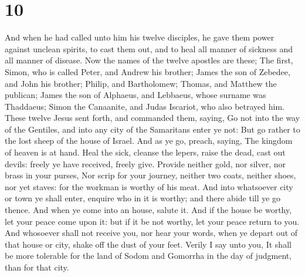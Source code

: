 \hypertarget{section-9}{%
\section{10}\label{section-9}}

 And when he had called unto him his twelve disciples, he
gave them power against unclean spirits, to cast them out, and to heal
all manner of sickness and all manner of disease.  Now the
names of the twelve apostles are these; The first, Simon, who is called
Peter, and Andrew his brother; James the son of Zebedee, and John his
brother;  Philip, and Bartholomew; Thomas, and Matthew the
publican; James the son of Alphaeus, and Lebbaeus, whose surname was
Thaddaeus;  Simon the Canaanite, and Judas Iscariot, who
also betrayed him.  These twelve Jesus sent forth, and
commanded them, saying, Go not into the way of the Gentiles, and into
any city of the Samaritans enter ye not:  But go rather to
the lost sheep of the house of Israel.  And as ye go,
preach, saying, The kingdom of heaven is at hand.  Heal
the sick, cleanse the lepers, raise the dead, cast out devils: freely ye
have received, freely give.  Provide neither gold, nor
silver, nor brass in your purses,  Nor scrip for your
journey, neither two coats, neither shoes, nor yet staves: for the
workman is worthy of his meat.  And into whatsoever city
or town ye shall enter, enquire who in it is worthy; and there abide
till ye go thence.  And when ye come into an house,
salute it.  And if the house be worthy, let your peace
come upon it: but if it be not worthy, let your peace return to you.
 And whosoever shall not receive you, nor hear your
words, when ye depart out of that house or city, shake off the dust of
your feet.  Verily I say unto you, It shall be more
tolerable for the land of Sodom and Gomorrha in the day of judgment,
than for that city.

